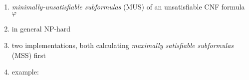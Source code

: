 \begin{enumerate}
\item \emph{minimally-unsatisfiable subformulas} (MUS) of an unsatisfiable CNF formula $\varphi$
\item in general NP-hard
\item two implementations, both calculating \emph{maximally satisfiable subformulas} (MSS) first
\item example: 
\begin{enumerate}
  \item $\varphi = (x_1) \land (\overline{x_1\) \land (\overline{x_1} \lor x_2) \land (\overline{x_2})$
  \item $\operatorname{coMSS}(\varphi) = \bigl{
      \{(x_1)\}, 
      \{(\overline{x_1}),(\overline{x_1} \lor x_2)\},
      \{(\overline{x_1}),(\overline{x_2}\)\}\bigr}$
  \item $\operatorname{MUS}(\varphi) = \bigl{
      \{(x_1),(\overline{x_1})\},
      \{(x_1),(\overline{x_1} \lor x_2), (\overline{x_2})\}\bigr}$
\end{enumerate}
\end{enumerate}


